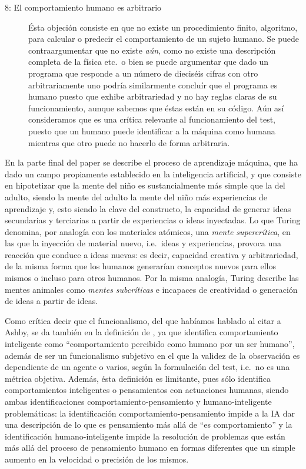 \documentclass[12pt]{memoir}
\begin{document}
\begin{description}
	\item[8: El comportamiento humano es arbitrario] Ésta objeción consiste en que no existe un procedimiento finito, algoritmo, para calcular o predecir el comportamiento de un sujeto humano. Se puede contraargumentar que no existe \textit{aún}, como no existe una descripción completa de la física etc.\ o bien se puede argumentar que dado un programa que responde a un número de dieciséis cifras con otro arbitrariamente uno podría similarmente concluír que el programa es humano puesto que exhibe arbitrariedad y no hay reglas claras de su funcionamiento, aunque sabemos que éstas están en su código. Aún así consideramos que es una crítica relevante al funcionamiento del test, puesto que un humano puede identificar a la máquina como humana mientras que otro puede no hacerlo de forma arbitraria.
\end{description}

En la parte final del paper se describe el proceso de aprendizaje máquina, que ha dado un campo propiamente establecido en la inteligencia artificial, y que consiste en hipotetizar que la mente del niño es sustancialmente más simple que la del adulto, siendo la mente del adulto la mente del niño más experiencias de aprendizaje y, esto siendo la clave del constructo, la capacidad de generar ideas secundarias y terciarias a partir de experiencias o ideas inyectadas. Lo que Turing denomina, por analogía con los materiales atómicos, una \textit{mente supercrítica}, en las que la inyección de material nuevo, i.e.\ ideas y experiencias, provoca una reacción que conduce a ideas nuevas: es decir, capacidad creativa y arbitrariedad, de la misma forma que los humanos generarían conceptos nuevos para ellos mismos o incluso para otros humanos. Por la misma analogía, Turing describe las mentes animales como \textit{mentes subcríticas} e incapaces de creatividad o generación de ideas a partir de ideas.

Como crítica decir que el funcionalismo, del que habíamos hablado al citar a Ashby, se da también en la definición de \cite{Turing1950cmi}, ya que identifica comportamiento inteligente como ``comportamiento percibido como humano por un ser humano'', además de ser un funcionalismo subjetivo en el que la validez de la observación es dependiente de un agente o varios, según la formulación del test, i.e.\ no es una métrica objetiva. Además, ésta definición es limitante, pues sólo identifica comportamientos inteligentes o pensamientos con actuaciones humanas, siendo ambas identificaciones comportamiento-pensamiento y humano-inteligente problemáticas: la identificación comportamiento-pensamiento impide a la IA dar una descripción de lo que es pensamiento más allá de ``es comportamiento'' y la identificación humano-inteligente impide la resolución de problemas que están más allá del proceso de pensamiento humano en formas diferentes que un simple aumento en la velocidad o precisión de los mismos. 
\end{document}
